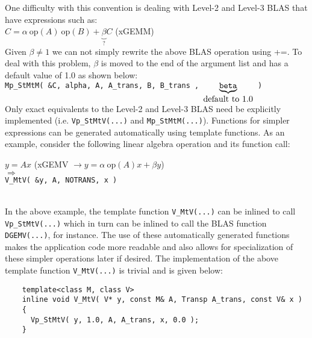 \documentclass[acmtoms,acmnow]{acmtrans2m}
\begin{document}
One difficulty with this convention is dealing with Level-2 and Level-3 BLAS that have expressions such as:\\[1ex]

\hspace*{4ex}$C = \alpha \: \mbox{op}(A) \: \mbox{op}(B) + \underbrace{\beta}_{
	\mbox{?} } C$ \hspace{4ex} (xGEMM)\\[1ex]

Given $\beta \neq 1$ we can not simply rewrite the above BLAS operation using +=.  To deal with this
problem, $\beta$ is moved to the end of the argument list and has a default value of 1.0 as shown below:\\[1.0ex]

\hspace*{4ex}\texttt{Mp\_StMtM( \&C, alpha, A, A\_trans, B, B\_trans
	, $\underbrace{\mbox{\texttt{beta}}}_{\mbox{default to 1.0}}$ )}\\[1.0ex]

Only exact equivalents to the Level-2 and Level-3 BLAS need be explicitly
implemented (i.e. {}\texttt{Vp\_StMtV(...)} and {}\texttt{Mp\_StMtM(...)}).  Functions for simpler
expressions can be generated automatically using template functions.  As an example, consider the
following linear algebra operation and its function call:\\[1.0ex]

{\bsinglespace
\hspace*{4ex}\parbox{\textwidth}{
$y = A x$ \hspace{4ex} (xGEMV $\rightarrow y = \alpha \: \mbox{op}(A) x + \beta y$)\\
$\Longrightarrow$\\
\texttt{V\_MtV( \&y, A, NOTRANS, x )}
}
\esinglespace}\\[1.0ex]

In the above example, the template function {}\texttt{V\_MtV(...)} can be
inlined to call {}\texttt{Vp\_StMtV(...)} which in turn can be inlined to call
the BLAS function {}\texttt{DGEMV(...)}, for instance.  The use of these
automatically generated functions makes the application code more readable and
also allows for specialization of these simpler operations later if desired.
The implementation of the above template function {}\texttt{V\_MtV(...)} is
trivial and is given below:

{\bsinglespace\small
\begin{verbatim}
    template<class M, class V>
    inline void V_MtV( V* y, const M& A, Transp A_trans, const V& x )
    {
      Vp_StMtV( y, 1.0, A, A_trans, x, 0.0 );
    }
\end{verbatim}
\esinglespace}
\end{document}
